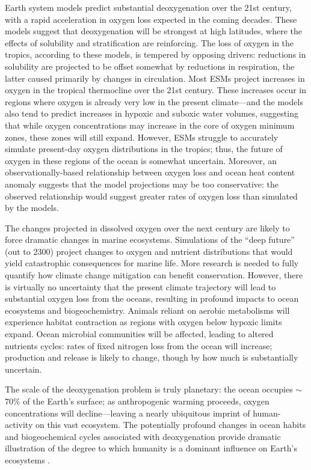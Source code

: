 \documentclass{report_chapter}
\begin{document}
Earth system models predict substantial deoxygenation over the 21st century, with a rapid acceleration in oxygen loss expected in the coming decades.
These models suggest that deoxygenation will be strongest at high latitudes, where the effects of solubility and stratification are reinforcing.
The loss of oxygen in the tropics, according to these models, is tempered by opposing drivers: reductions in solubility are projected to be offset somewhat by reductions in respiration, the latter caused primarily by changes in circulation.
Most ESMs project increases in oxygen in the tropical thermocline over the 21st century.
These increases occur in regions where oxygen is already very low in the present climate---and the models also tend to predict increases in hypoxic and suboxic water volumes, suggesting that while oxygen concentrations may increase in the core of oxygen minimum zones, these zones will still expand.
However, ESMs struggle to accurately simulate present-day oxygen distributions in the tropics; thus, the future of oxygen in these regions of the ocean is somewhat uncertain.
Moreover, an observationally-based relationship between oxygen loss and ocean heat content anomaly suggests that the model projections may be too conservative: the observed relationship would suggest greater rates of oxygen loss than simulated by the models.

The changes projected in dissolved oxygen over the next century are likely to force dramatic changes in marine ecosystems.
Simulations of the ``deep future'' (out to 2300) project changes to oxygen and nutrient distributions that would yield catastrophic consequences for marine life.
More research is needed to fully quantify how climate change mitigation can benefit conservation.
However, there is virtually no uncertainty that the present climate trajectory will lead to substantial oxygen loss from the oceans, resulting in profound impacts to ocean ecosystems and biogeochemistry.
Animals reliant on aerobic metabolisms will experience habitat contraction as regions with oxygen below hypoxic limits expand.
Ocean microbial communities will be affected, leading to altered nutrients cycles: rates of fixed nitrogen loss from the ocean will increase; \NNO{} production and release is likely to change, though by how much is substantially uncertain.

The scale of the deoxygenation problem is truly planetary: the ocean occupies $\sim$70\% of the Earth's surface; as anthropogenic warming proceeds, oxygen concentrations will decline---leaving a nearly ubiquitous imprint of human-activity on this vast ecosystem.
The potentially profound changes in ocean habits and biogeochemical cycles associated with deoxygenation provide dramatic illustration of the degree to which humanity is a dominant influence on Earth's ecosystems \citep{Vitousek-Mooney-etal-1997}.


\end{document}

